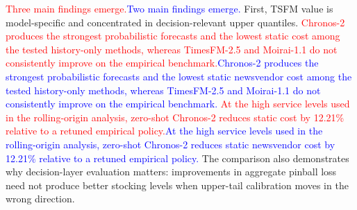 \documentclass[msom,dblanonrev]{informs4}
\newcommand{\add}[1]{\textcolor{blue}{#1}}
\newcommand{\reduce}[1]{\textcolor{red}{#1}\hspace{0.5em}}
\begin{document}
\reduce{Three main findings emerge.}\add{Two main findings emerge.}
First, TSFM value is model-specific and concentrated in decision-relevant upper quantiles.
\reduce{Chronos-2 produces the strongest probabilistic forecasts and the lowest static cost among the tested history-only methods, whereas TimesFM-2.5 and Moirai-1.1 do not consistently improve on the empirical benchmark.}\add{Chronos-2 produces the strongest probabilistic forecasts and the lowest static newsvendor cost among the tested history-only methods, whereas TimesFM-2.5 and Moirai-1.1 do not consistently improve on the empirical benchmark.}
\reduce{At the high service levels used in the rolling-origin analysis, zero-shot Chronos-2 reduces static cost by 12.21\% relative to a retuned empirical policy.}\add{At the high service levels used in the rolling-origin analysis, zero-shot Chronos-2 reduces static newsvendor cost by 12.21\% relative to a retuned empirical policy.}
The comparison also demonstrates why decision-layer evaluation matters: improvements in aggregate pinball loss need not produce better stocking levels when upper-tail calibration moves in the wrong direction.
\end{document}
